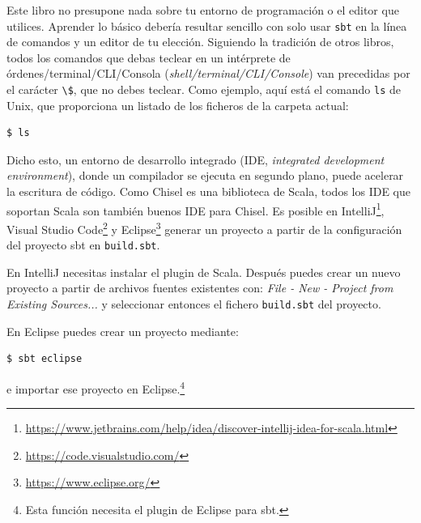 \documentclass[%
    10pt,
    headinclude, footinclude=false,
    openright, %
    notitlepage,
    cleardoublepage=empty,
    headsepline,
    numbers=noenddot,
    bibliography=totoc, index=totoc,
    ]{scrbook}
\newcommand{\code}[1]{{\lstinline[basicstyle=\small\ttfamily]{#1}}}
\newcommand{\myref}[2]{\href{#1}{#2}}
\renewcommand{\myref}[2]{{#2}{\footnote{\url{#1}}}}
\begin{document}
Este libro no presupone nada sobre tu entorno de programación o el editor que utilices.
Aprender lo básico debería resultar sencillo con solo usar \code{sbt} en la línea de comandos
y un editor de tu elección. Siguiendo la tradición de otros libros, todos los comandos que
debas teclear en un intérprete de órdenes/terminal/CLI/Consola (\emph{shell/terminal/CLI/Console}) van
precedidas por el carácter \code{\$}, que no debes teclear. Como ejemplo, aquí está el comando
\code{ls} de Unix, que proporciona un listado de los ficheros de la carpeta actual:

\begin{verbatim}
$ ls
\end{verbatim}


Dicho esto, un entorno de desarrollo integrado (IDE, \emph{integrated development
environment}), donde un compilador se ejecuta en segundo plano, puede acelerar la
escritura de código. Como Chisel es una biblioteca de Scala, todos los IDE
que soportan Scala son también buenos IDE para Chisel.
Es posible en
\myref{https://www.jetbrains.com/help/idea/discover-intellij-idea-for-scala.html}{IntelliJ},
\myref{https://code.visualstudio.com/}{Visual Studio Code} y
 \myref{https://www.eclipse.org/}{Eclipse}
generar un proyecto a partir de la configuración del proyecto sbt en \code{build.sbt}.


En IntelliJ necesitas instalar el plugin de Scala. Después puedes crear un nuevo proyecto a partir de archivos fuentes 
existentes con: \emph{File - New - Project from Existing Sources...} y seleccionar entonces el fichero
\code{build.sbt} del proyecto.

En Eclipse puedes crear un proyecto mediante:
\begin{verbatim}
$ sbt eclipse
\end{verbatim}
e importar ese proyecto en Eclipse.\footnote{Esta función necesita el plugin de Eclipse para sbt.}
\end{document}
